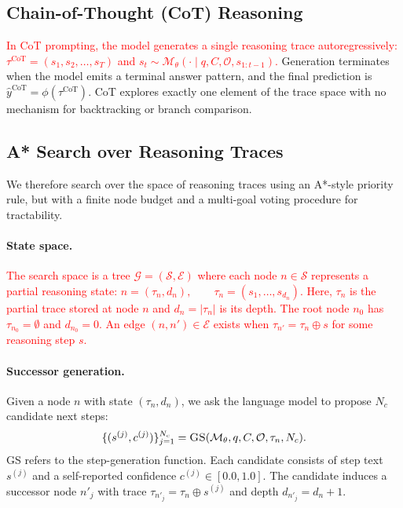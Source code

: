 \documentclass[11pt]{article}
\begin{document}
\subsection{Chain-of-Thought (CoT) Reasoning}
\label{sec:cot}

\textcolor{red}{In CoT prompting, the model generates a single reasoning trace autoregressively: $\tau^{\text{CoT}} = (s_1, s_2, \ldots, s_T)$ and $s_t \sim \mathcal{M}_\theta(\cdot \mid q, C, \mathcal{O}, s_{1:t-1})$.}
Generation terminates when the model emits a terminal answer pattern, and the final prediction is $\hat{y}^{\text{CoT}} = \phi(\tau^{\text{CoT}})$. CoT explores exactly one element of the trace space with no mechanism for backtracking or branch comparison.

\subsection{A* Search over Reasoning Traces}
\label{sec:astar}

We therefore search over the space of reasoning traces using an A*-style priority rule, but with a finite node budget and a multi-goal voting procedure for tractability.

\paragraph{State space.}
\textcolor{red}{The search space is a tree $\mathcal{G} = (\mathcal{S}, \mathcal{E})$ where each node $n \in \mathcal{S}$ represents a partial reasoning state: $n = (\tau_n, d_n), \qquad \tau_n = (s_1, \ldots, s_{d_n})$. Here, $\tau_n$ is the partial trace stored at node $n$ and $d_n = |\tau_n|$ is its depth. The root node $n_0$ has $\tau_{n_0} = \emptyset$ and $d_{n_0} = 0$. An edge $(n,n') \in \mathcal{E}$ exists when $\tau_{n'} = \tau_n \oplus s$ for some reasoning step $s$.}

\paragraph{Successor generation.}
Given a node $n$ with state $(\tau_n, d_n)$, we ask the language model to propose $N_c$ candidate next steps:
\begin{equation}
\{(s^{(j)}, c^{(j)})\}_{j=1}^{N_c} = \textsc{GS}(\mathcal{M}_\theta, q, C, \mathcal{O}, \tau_n, N_c).
\label{eq:successor}
\end{equation}
\textsc{GS} refers to the step-generation function. Each candidate consists of step text $s^{(j)}$ and a self-reported confidence $c^{(j)} \in [0.0,1.0]$. The candidate induces a successor node $n'_j$ with trace $\tau_{n'_j} = \tau_n \oplus s^{(j)}$ and depth $d_{n'_j} = d_n + 1$.
\end{document}
